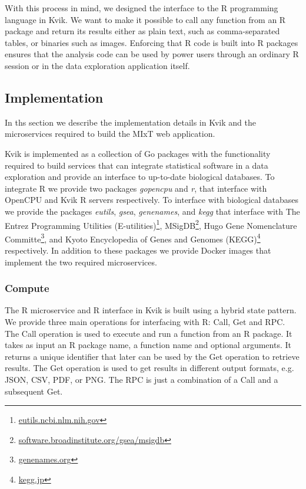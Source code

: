 With this process in mind, we designed the interface to the R programming
language in Kvik. We want to make it possible to call any function from an R
package and return its results either as plain text, such as comma-separated
tables, or binaries such as images. Enforcing that R code is built into R
packages ensures that the analysis code can be used by power users through an
ordinary R session or in the data exploration application itself. 


\subsection*{Implementation}
In ths section we describe the implementation details in Kvik and the
microservices required to build the MIxT web application. 

Kvik is implemented as a collection of Go packages with the
functionality required to build services that can integrate statistical
software in a data exploration and provide an interface to up-to-date biological
databases. To integrate R we provide two packages \emph{gopencpu} and
\emph{r}, that interface with OpenCPU and Kvik R servers respectively. To
interface with biological databases we provide the packages \emph{eutils},
\emph{gsea}, \emph{genenames}, and \emph{kegg} that interface with
The Entrez Programming Utilities
(E-utilities)\footnote{\url{eutils.ncbi.nlm.nih.gov}},
MSigDB\footnote{\url{software.broadinstitute.org/gsea/msigdb}}, Hugo Gene
Nomenclature Committe\footnote{\url{genenames.org}}, and Kyoto Encyclopedia
of Genes and Genomes (KEGG)\footnote{\url{kegg.jp}} respectively. 
In addition to these packages we provide Docker images that implement the
two required microservices. 

\subsubsection*{Compute}

The R microservice and R interface in Kvik is built using a hybrid state
pattern\cite{opencpu}. We provide three main operations for interfacing with R:
Call, Get and RPC. The Call operation is used to execute and run a function from
an R package. 
It takes as input an R package name, a function name and optional
arguments. It returns a unique identifier that later can be used by the Get
operation to retrieve results. The Get operation is used to get results in
different output formats, e.g. JSON, CSV, PDF, or PNG. The RPC is just a
combination of a Call and a subsequent Get. 


